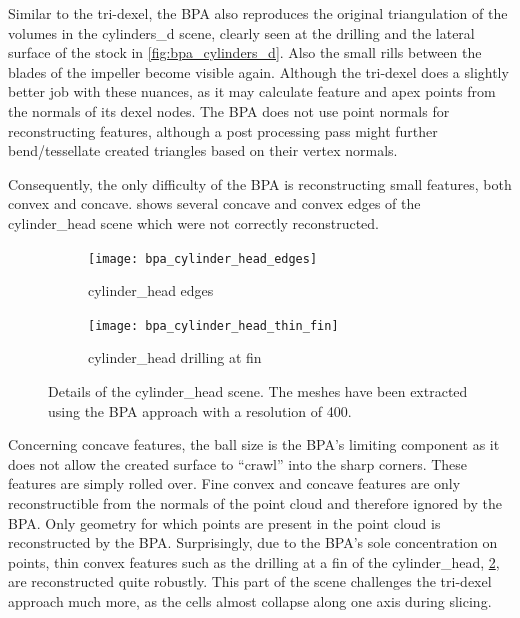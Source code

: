Similar to the tri-dexel, the BPA also reproduces the original triangulation of the volumes in the cylinders\_d scene, clearly seen at the drilling and the lateral surface of the stock in \cref{fig:bpa_cylinders_d}.
Also the small rills between the blades of the impeller become visible again.
Although the tri-dexel does a slightly better job with these nuances, as it may calculate feature and apex points from the normals of its dexel nodes.
The BPA does not use point normals for reconstructing features, although a post processing pass might \eg further bend/tessellate created triangles based on their vertex normals.

Consequently, the only difficulty of the BPA is reconstructing small features, both convex and concave.
 shows several concave and convex edges of the cylinder\_head scene which were not correctly reconstructed.
%
\begin{figure}
	\centering
	\begin{subfigure}[b]{0.49\textwidth}
		\centering
		\texttt{[image: bpa\_cylinder\_head\_edges]}
		\caption{cylinder\_head edges}
		\label{fig:bpa_cylinder_head_edges}
	\end{subfigure}
	\begin{subfigure}[b]{0.49\textwidth}
		\centering
		\texttt{[image: bpa\_cylinder\_head\_thin\_fin]}
		\caption{cylinder\_head drilling at fin}
		\label{fig:bpa_cylinder_head_thin_fin}
	\end{subfigure}
	\caption{
		Details of the cylinder\_head scene.
		The meshes have been extracted using the BPA approach with a resolution of 400.
	}
	\label{fig:bpa_cylinder_head_details}
\end{figure}
%
Concerning concave features, the ball size is the BPA's limiting component as it does not allow the created surface to \enquote{crawl} into the sharp corners.
These features are simply rolled over.
Fine convex and concave features are only reconstructible from the normals of the point cloud and therefore ignored by the BPA.
Only geometry for which points are present in the point cloud is reconstructed by the BPA.
Surprisingly, due to the BPA's sole concentration on points, thin convex features such as the drilling at a fin of the cylinder\_head, \cf \cref{fig:bpa_cylinder_head_thin_fin}, are reconstructed quite robustly.
This part of the scene challenges the tri-dexel approach much more, as the cells almost collapse along one axis during slicing.

